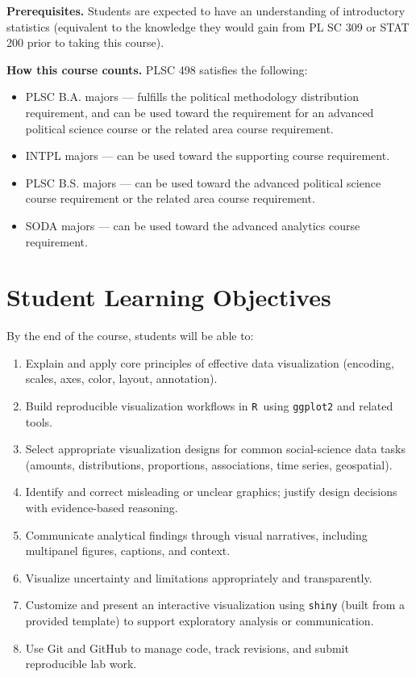 \documentclass[letterpaper,11pt]{article}
\newcommand{\R}{\texttt{R}}
\newcommand{\compresslist}{
\setlength{\itemsep}{1pt}
\setlength{\parskip}{0pt}
\setlength{\parsep}{0pt}
}
\begin{document}
\medskip
\noindent \textbf{Prerequisites.} Students are expected to have an understanding of introductory statistics (equivalent to the knowledge they would gain from PL SC 309 or STAT 200 prior to taking this course).

\medskip
\noindent \textbf{How this course counts.} PLSC 498 satisfies the following:
\begin{itemize}\compresslist
\item PLSC B.A. majors --- fulfills the political methodology distribution requirement, and can be used toward the requirement for an advanced political science course or the related area course requirement.
\item INTPL majors --- can be used toward the supporting course requirement.
\item PLSC B.S. majors --- can be used toward the advanced political science course requirement or the related area course requirement.
\item SODA majors --- can be used toward the advanced analytics course requirement.
\end{itemize}

\section*{Student Learning Objectives}
By the end of the course, students will be able to:
\begin{enumerate}
\item Explain and apply core principles of effective data visualization (encoding, scales, axes, color, layout, annotation).
\item Build reproducible visualization workflows in \R\ using \texttt{ggplot2} and related tools.
\item Select appropriate visualization designs for common social-science data tasks (amounts, distributions, proportions, associations, time series, geospatial).
\item Identify and correct misleading or unclear graphics; justify design decisions with evidence-based reasoning.
\item Communicate analytical findings through visual narratives, including multipanel figures, captions, and context.
\item Visualize uncertainty and limitations appropriately and transparently.
\item Customize and present an interactive visualization using \texttt{shiny} (built from a provided template) to support exploratory analysis or communication.
\item Use Git and GitHub to manage code, track revisions, and submit reproducible lab work.
\end{enumerate}
\end{document}
